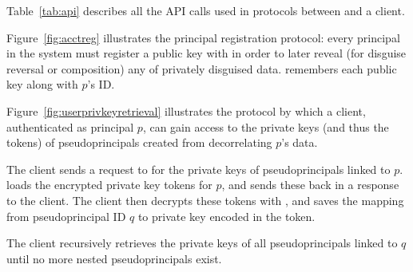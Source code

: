 Table~\ref{tab:api} describes all the API calls used in protocols between \sys and a client.
\fi

Figure~\ref{fig:acctreg} illustrates the principal registration protocol: every principal in the
system must register a public key with \sys in order to later reveal (for disguise reversal or
composition) any of privately disguised data. \sys remembers each public key  along with
$p$'s ID.

\begin{figure*}[t!]
\caption{\textbf{Principal public key registration.}}
\label{fig:acctreg}
\end{figure*} 

Figure~\ref{fig:userprivkeyretrieval} illustrates the protocol by which a client, authenticated as
principal $p$, can gain access to the private keys (and thus the tokens) of pseudoprincipals created
from decorrelating $p$'s data.

The client sends a request to \sys for the private keys of pseudoprincipals linked to $p$. \sys
loads the encrypted private key tokens for $p$, and sends these back in a response to the client.
%
The client then decrypts these tokens with , and saves the mapping from pseudoprincipal ID
$q$ to private key  encoded in the token.

The client recursively retrieves the private keys of all pseudoprincipals linked to $q$ until
no more nested pseudoprincipals exist.

